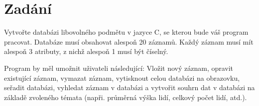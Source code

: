 \chapter{Zadání}
Vytvořte databázi libovolného podmětu v jazyce C, se kterou bude váš program pracovat. 
Databáze musí obsahovat alespoň 20 záznamů. Každý záznam musí mít alespoň 3 atributy, 
z nichž alespoň 1 musí být číselný. 

Program by měl umožnit uživateli následující: Vložit nový záznam, opravit existující záznam, 
vymazat záznam, vytisknout celou databázi na obrazovku, seřadit databázi, 
vyhledat záznam v databázi a vytvořit souhrn dat v databázi na základě zvoleného témata 
(napři. průměrná výška lidí, celkový počet lidí, atd.). 

